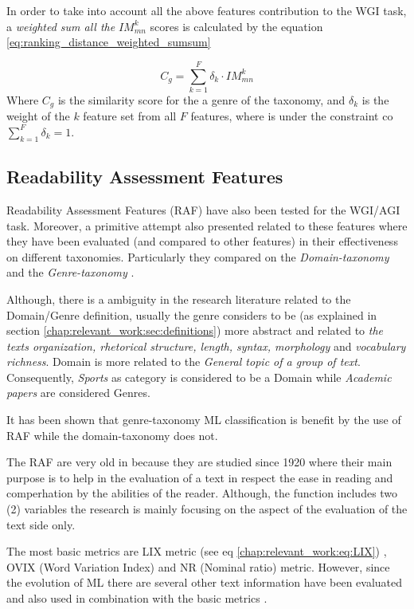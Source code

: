 In order to take into account all the above features contribution to the WGI task, a \textit{weighted sum all the} $IM^{k}_{mn}$ scores is calculated by the equation \ref{eq:ranking_distance_weighted_sumsum}

\begin{equation}\label{eq:ranking_distance_weighted_sumsum}
	C_{g} = \sum_{k=1}^{F} \delta_{k} \cdot IM_{mn}^{k}
\end{equation}
Where $C_{g}$ is the similarity score for the a genre of the taxonomy, and $\delta_{k}$ is the weight of the $k$ feature set from all $F$ features, where is under the constraint co $\sum_{k=1}^{F} \delta_{k} = 1$.


\subsection{Readability Assessment Features}

Readability Assessment Features (RAF) have also been tested for the WGI/AGI task. Moreover, a primitive attempt also presented related to these features where they have been evaluated (and compared to other features) in their effectiveness on different taxonomies. Particularly they compared on the \textit{Domain-taxonomy} and the \textit{Genre-taxonomy} \parencite{falkenjack2016exploratory}.

Although, there is a ambiguity in the research literature related to the Domain/Genre definition, usually the genre considers to be (as explained in section \ref{chap:relevant_work:sec:definitions}) more abstract and related to \textit{the texts organization, rhetorical structure, length, syntax, morphology} and \textit{vocabulary richness}. Domain is more related to the \textit{General topic of a group of text}. Consequently, \textit{Sports} as category is considered to be a Domain while \textit{Academic papers} are considered Genres.

It has been shown that genre-taxonomy ML classification is benefit by the use of RAF while the domain-taxonomy does not. 

The RAF are very old in because they are studied since 1920 where their main purpose is to help in the evaluation of a text in respect the ease in reading and comperhation by the abilities of the reader. Although, the function includes two (2) variables the research is mainly focusing on the aspect of the evaluation of the text side only. 

The most basic metrics are LIX metric (see eq \ref{chap:relevant_work:eq:LIX}) , OVIX (Word Variation Index) and NR (Nominal ratio) metric. However, since the evolution of ML there are several other text information have been evaluated and also used in combination with the basic metrics \parencite{falkenjack2013features}.

